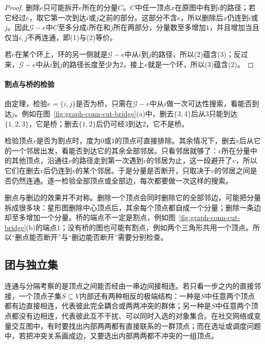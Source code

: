 \begin{proof}
删除$e$只可能拆开$e$所在的分量$C$。$C$中任一顶点$x$在原图中有到$i$的路径；若它经过$e$，取它第一次到达$i$或$j$之前的部分。这部分不含$e$，所以删除后$x$仍连到$i$或$j$。因此$\mathcal G-e$中$C$至多分成$i$所在和$j$所在两部分，分量数至多增加$1$，并且增加当且仅当$i,j$不再连通，即(1)与(2)等价。

若$e$在某个环上，环的另一侧就是$\mathcal G-e$中从$i$到$j$的路径，所以(2)蕴含(3)；反过来，$\mathcal G-e$中从$i$到$j$的路径长度至少为$2$，接上$e$就是一个环，所以(3)蕴含(2)。
\end{proof}

\paragraph{割点与桥的检验}
由定理，检验$e=\{i,j\}$是否为桥，只需在$\mathcal G-e$中从$i$做一次可达性搜索，看能否到达$j$。例如在图~\ref{fig:graph-conn-cut-bridge}(a)中，删去$\{3,4\}$后从$3$只能到达$\{1,2,3\}$，它是桥；删去$\{1,2\}$后仍可经$3$到达$2$，它不是桥。

检验顶点$v$是否为割点时，度为$0$或$1$的顶点可直接排除。其余情况下，删去$v$后从它的一个邻居出发，看能否到达它的其余全部邻居。只看邻居就够了：$v$所在分量中的其他顶点，沿通往$v$的路径走到第一次遇到$v$的邻居为止，这一段避开了$v$，所以它们在删去$v$后仍连到$v$的某个邻居。于是分量是否断开，只取决于$v$的邻居之间是否仍然连通。逐一检验全部顶点或全部边，每次都要做一次这样的搜索。

删点与删边的效果并不对称。删除一个顶点会同时删除它的全部邻边，可能把分量拆成很多块：星形图删除中心顶点后，其余每个顶点都自成一个分量；删除一条边却至多增加一个分量。桥的端点不一定是割点，例如图~\ref{fig:graph-conn-cut-bridge}(b)的端点$1$；没有桥的图也可能有割点，例如两个三角形共用一个顶点。所以“删点能否断开”与“删边能否断开”需要分别检查。

\subsection{团与独立集}
\label{sec:graph-cliques-independent-sets}

连通与分隔考察的是顶点之间能否经由一串边间接相连。若只看一步之内的直接邻接，一个顶点子集$S\subseteq V$内部还有两种相反的极端结构：一种是$S$中任意两个顶点都有边直接相连，代表彼此完全耦合或两两冲突的群体；另一种是$S$中任意两个顶点都没有边相连，代表彼此互不干扰、可以同时入选的对象集合。在社交网络或变量交互图中，有时要找出内部两两都有直接联系的一群顶点；而在选址或调度问题中，若把冲突关系画成边，又要选出内部两两都不冲突的一组顶点。

